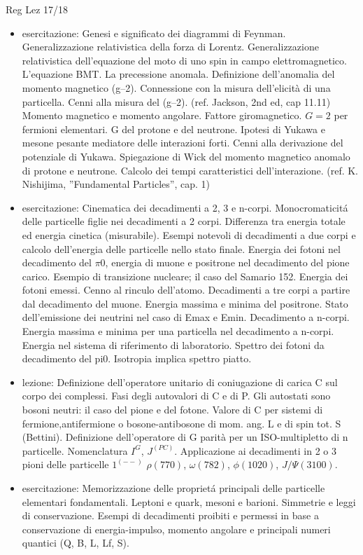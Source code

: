 \begin{frame}[allowframebreaks]{Reg Lez 17/18}
\begin{itemize}
\item esercitazione: Genesi e significato dei diagrammi di Feynman. Generalizzazione relativistica della forza di Lorentz. Generalizzazione relativistica dell'equazione del moto di uno spin in campo elettromagnetico. L'equazione BMT. La precessione anomala. Definizione dell'anomalia del momento magnetico (g–2). Connessione con la misura dell'elicità di una particella. Cenni alla misura del (g–2). (ref. Jackson, 2nd ed, cap 11.11) Momento magnetico e momento angolare. Fattore giromagnetico. $G=2$ per fermioni elementari. G del protone e del neutrone. Ipotesi di Yukawa e mesone pesante mediatore delle interazioni forti. Cenni alla derivazione del potenziale di Yukawa. Spiegazione di Wick del momento magnetico anomalo di protone e neutrone. Calcolo dei tempi caratteristici dell'interazione. (ref. K. Nishijima, ''Fundamental Particles'', cap. 1)

\item esercitazione: Cinematica dei decadimenti a 2, 3 e n-corpi. Monocromaticit\'a delle particelle figlie nei decadimenti a 2 corpi. Differenza tra energia totale ed energia cinetica (misurabile). Esempi notevoli di decadimenti a due corpi e calcolo dell'energia delle particelle nello stato finale. Energia dei fotoni nel decadimento del $\pi0$, energia di muone e positrone nel decadimento del pione carico. Esempio di transizione nucleare; il caso del Samario 152. Energia dei fotoni emessi. Cenno al rinculo dell'atomo. Decadimenti a tre corpi a partire dal decadimento del muone. Energia massima e minima del positrone. Stato dell'emissione dei neutrini nel caso di Emax e Emin. Decadimento a n-corpi. Energia massima e minima per una particella nel decadimento a n-corpi. Energia nel sistema di riferimento di laboratorio. Spettro dei fotoni da decadimento del pi0. Isotropia implica spettro piatto.

\item lezione: Definizione dell'operatore unitario di coniugazione di carica C sul corpo dei complessi. Fasi degli autovalori di C e di P. Gli autostati sono bosoni neutri: il caso del pione e del fotone. Valore di C per sistemi di fermione,antifermione o bosone-antibosone di mom. ang. L e di spin tot. S (Bettini). Definizione dell'operatore di G parità per un ISO-multipletto di n particelle. Nomenclatura $I^G$, $J^{(PC)}$. Applicazione ai decadimenti in 2 o 3 pioni delle particelle $1^{(--)}$ $\rho(770)$, $\omega(782)$, $\phi(1020)$, $J/\Psi(3100)$.

\item esercitazione: Memorizzazione delle propriet\'a principali delle particelle elementari fondamentali. Leptoni e quark, mesoni e barioni. Simmetrie e leggi di conservazione. Esempi di decadimenti proibiti e permessi in base a conservazione di energia-impulso, momento angolare e principali numeri quantici (Q, B, L, Lf, S).


\end{itemize}
\end{frame}
